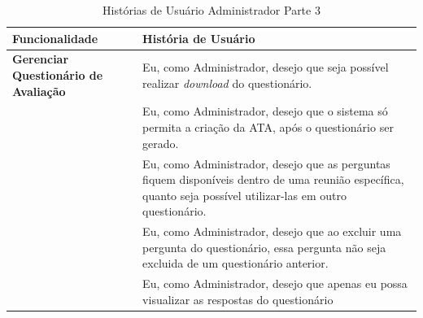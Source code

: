 \begin{table}[H]
	\begin{tabular}{|p{4.0cm}|p{11.0cm}|} 
	\hline
	\textbf{Funcionalidade} & \textbf{História de Usuário} \\ \hline
	\textbf{Gerenciar Questionário de Avaliação} & Eu, como Administrador, desejo que seja possível realizar \textit{download} do questionário. \\ \hline
	& Eu, como Administrador, desejo que o sistema só permita a criação da ATA, após o questionário ser gerado. \\ \hline
	& Eu, como Administrador, desejo que as perguntas fiquem disponíveis dentro de uma reunião específica, quanto seja possível utilizar-las em outro questionário. \\ \hline
	& Eu, como Administrador, desejo que ao excluir uma pergunta do questionário, essa pergunta não seja excluida de um questionário anterior. \\ \hline
	& Eu, como Administrador, desejo que apenas eu possa visualizar as respostas do questionário \\ \hline
	\end{tabular}
	 \caption{Histórias de Usuário Administrador Parte 3}
	 \label{tab:historias_de_usuario_administrador_parte3}
\end{table}









